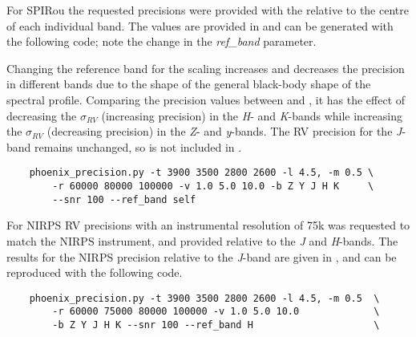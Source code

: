 For {SPIRou} the requested precisions were provided with the \snr{} relative to the centre of each individual band. The values are provided in  and can be generated with the following code; note the change in the \emph{ref\_band} parameter.


Changing the reference band for the \snr{} scaling increases and decreases the precision in different bands due to the shape of the general black-body shape of the spectral profile. Comparing the precision values between  and , it has the effect of decreasing the $\sigma_{RV}$ (increasing precision) in the \emph{H}- and \emph{K}-bands while increasing the $\sigma_{RV}$ (decreasing precision) in the \emph{Z}- and \emph{y}-bands. The RV precision for the \emph{J}-band remains unchanged, so is not included in . 


\begin{lstlisting}
    phoenix_precision.py -t 3900 3500 2800 2600 -l 4.5, -m 0.5 \
        -r 60000 80000 100000 -v 1.0 5.0 10.0 -b Z Y J H K     \
        --snr 100 --ref_band self
\end{lstlisting}


For {NIRPS} RV precisions with an instrumental resolution of 75k was requested to match the {NIRPS} instrument, and provided relative to the \emph{J} and \emph{H}-bands. The results for the {NIRPS} precision relative to the \emph{J}-band are given in , and can be reproduced with the following code.

\begin{lstlisting}
    phoenix_precision.py -t 3900 3500 2800 2600 -l 4.5, -m 0.5  \ 
        -r 60000 75000 80000 100000 -v 1.0 5.0 10.0             \
        -b Z Y J H K --snr 100 --ref_band H                     \
\end{lstlisting}









